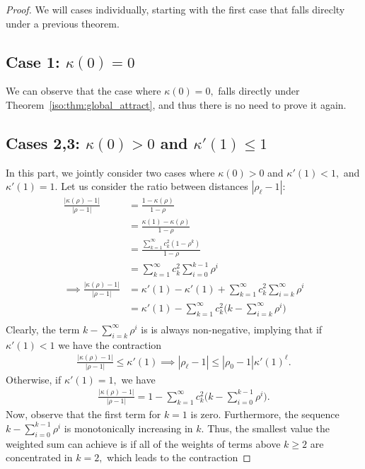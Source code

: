 \begin{proof}
We will cases individually, starting with the first case that falls direclty under a previous theorem. 

\subsection*{Case 1: $\kappa(0)=0$}
We can observe that the case where $\kappa(0)=0,$ falls directly under Theorem~\ref{iso:thm:global_attract}, and thus there is no need to prove it again.

\subsection*{Cases 2,3: $\kappa(0)>0$ and $\kappa'(1)\le 1$} In this part, we jointly consider two cases where $\kappa(0)>0$ and $\kappa'(1) < 1,$ and $\kappa'(1)=1.$ Let us consider the ratio between distances $|\rho_\ell-1|$:
\begin{align*}
    \frac{|\kappa(\rho)-1|}{|\rho-1|} &= \frac{1-\kappa(\rho)}{1-\rho} \\
    &=\frac{\kappa(1)-\kappa(\rho)}{1-\rho}\\
    &=\frac{\sum_{k=1}^\infty c_k^2 (1-\rho^k)}{1-\rho}\\
    &=\sum_{k=1}^\infty c_k^2 \sum_{i=0}^{k-1}\rho^i\\
\implies \frac{|\kappa(\rho)-1|}{|\rho-1|} &=\kappa'(1)-\kappa'(1)+\sum_{k=1}^\infty c_k^2 \sum_{i=k}^\infty \rho^i\\
&= \kappa'(1)-\sum_{k=1}^\infty c_k^2 \big(k-\sum_{i=k}^\infty \rho^i\big)\\
\end{align*}
Clearly, the term $k-\sum_{i=k}^\infty \rho^i$ is is always non-negative, implying that if $\kappa'(1)<1$ we have the contraction 
\begin{align*}
    \frac{|\kappa(\rho)-1|}{|\rho-1|} \le \kappa'(1) \implies |\rho_\ell-1| \le |\rho_0-1| \kappa'(1)^\ell.
\end{align*}
Otherwise, if $\kappa'(1)=1,$ we have 
\begin{align*}
    \frac{|\kappa(\rho)-1|}{|\rho-1|} = 1-\sum_{k=1}^\infty c_k^2 \big(k-\sum_{i=0}^{k-1} \rho^i\big).
\end{align*}
Now, observe that the first term for $k=1$ is zero. Furthermore, the sequence $k-\sum_{i=0}^{k-1}\rho^i$ is monotonically increasing in $k$. Thus, the smallest value the weighted sum can achieve is if all of the weights of terms above $k\ge 2$ are concentrated in $k=2,$ which leads to the contraction

\end{proof}
